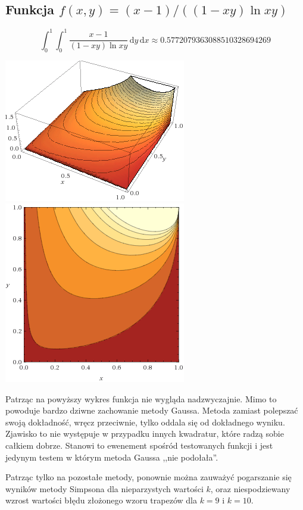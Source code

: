 \documentclass[11pt,leqno]{article}
\newcommand{\dvar}[1]{\,\mathrm{d}#1}
\begin{document}
\subsection{Funkcja $f(x, y) = (x - 1) / ((1 - xy) \ln xy)$}

\[
  \int_{0}^{1} \int_{0}^{1} \frac{x - 1}{(1 - xy) \ln xy} \dvar{y} \dvar{x}
\approx
  0.5772079363088510328694269
\]

\begin{center}
\includegraphics[scale=0.65,natwidth=640,natheight=480]{gfx/testa1g.png}
\includegraphics[scale=0.65,natwidth=640,natheight=480]{gfx/testa1p.png}\\
\end{center}

Patrząc na powyższy wykres funkcja nie wygląda nadzwyczajnie. Mimo to powoduje bardzo dziwne zachowanie metody Gaussa. Metoda zamiast polepszać swoją dokładność, wręcz przeciwnie, tylko oddala się od dokładnego wyniku. Zjawisko to nie występuje w przypadku innych kwadratur, które radzą sobie całkiem dobrze. Stanowi to ewenement spośród testowanych funkcji i jest jedynym testem w którym metoda Gaussa ,,nie podołała''.

Patrząc tylko na pozostałe metody, ponownie można zauważyć pogarszanie się wyników metody Simpsona dla nieparzystych wartości $k$, oraz niespodziewany wzrost wartości błędu złożonego wzoru trapezów dla $k = 9$ i $k = 10$.
\end{document}
